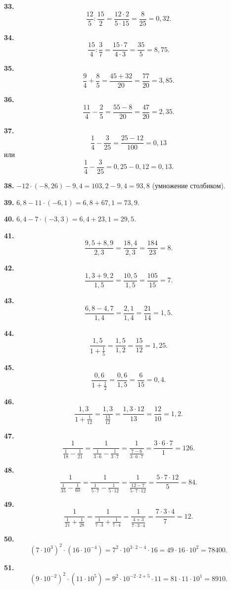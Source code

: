 \textbf{33.} $$\frac{12}{5}:\frac{15}{2}=\frac{12\cdot2}{5\cdot15}=\frac{8}{25}=0,32.$$

\textbf{34.} $$\frac{15}{4}:\frac{3}{7}=\frac{15\cdot7}{4\cdot3}=\frac{35}{5}=8,75.$$

\textbf{35.} $$\frac{9}{4}+\frac{8}{5}=\frac{45+32}{20}=\frac{77}{20}=3,85.$$

\textbf{36.} $$\frac{11}{4}-\frac{2}{5}=\frac{55-8}{20}=\frac{47}{20}=2,35.$$

\newpage \textbf{37.} $$\frac{1}{4}-\frac{3}{25}=\frac{25-12}{100}=0,13$$ или $$\frac{1}{4}-\frac{3}{25}=0,25-0,12=0,13.$$

\textbf{38.} $-12\cdot\left(-8,26\right)-9,4=103,2-9,4=93,8$ (умножение столбиком).

\textbf{39.} $6,8-11\cdot\left(-6,1\right)=6,8+67,1=73,9.$

\textbf{40.} $6,4-7\cdot\left(-3,3\right)=6,4+23,1=29,5.$

\textbf{41.} $$\frac{9,5+8,9}{2,3}=\frac{18,4}{2,3}=\frac{184}{23}=8.$$

\textbf{42.} $$\frac{1,3+9,2}{1,5}=\frac{10,5}{1,5}=\frac{105}{15}=7.$$

\textbf{43.} $$\frac{6,8-4,7}{1,4}=\frac{2,1}{1,4}=\frac{21}{14}=1,5.$$

\textbf{44.} $$\frac{1,5}{1+\frac{1}{5}}=\frac{1,5}{1,2}=\frac{15}{12}=1,25.$$

\textbf{45.} $$\frac{0,6}{1+\frac{1}{2}}=\frac{0,6}{1,5}=\frac{6}{15}=0,4.$$

\textbf{46.} $$\frac{1,3}{1+\frac{1}{12}}=\frac{1,3}{\frac{13}{12}}=\frac{1,3\cdot12}{13}=\frac{12}{10}=1,2.$$

\textbf{47.}  $$\frac{1}{\frac{1}{18}-\frac{1}{21}}=\frac{1}{\frac{1}{3\cdot6}-\frac{1}{3\cdot7}}=\frac{1}{\frac{7-6}{3\cdot6\cdot7}}=\frac{3\cdot6\cdot7}{1}=126.$$

\newpage \textbf{48.} $$\frac{1}{\frac{1}{35}-\frac{1}{60}}=\frac{1}{\frac{1}{5\cdot7}-\frac{1}{5\cdot12}}=\frac{1}{\frac{12-7}{5\cdot7\cdot12}}=\frac{5\cdot7\cdot12}{5}=84.$$

\textbf{49.} $$\frac{1}{\frac{1}{21}+\frac{1}{28}}=\frac{1}{\frac{1}{7\cdot3}+\frac{1}{7\cdot4}}=\frac{1}{\frac{4+3}{7\cdot3\cdot4}}=\frac{7\cdot3\cdot4}{7}=12.$$

\textbf{50.} $$\left(7\cdot10^3\right)^2\cdot\left(16\cdot10^{-4}\right)=7^2\cdot10^{3\cdot2-4}\cdot16=49\cdot16\cdot10^2=78400.$$

\textbf{51.} $$\left(9\cdot10^{-2}\right)^2\cdot\left(11\cdot10^5\right)=9^2\cdot10^{-2\cdot2+5}\cdot11=81\cdot11\cdot10^1=8910.$$

